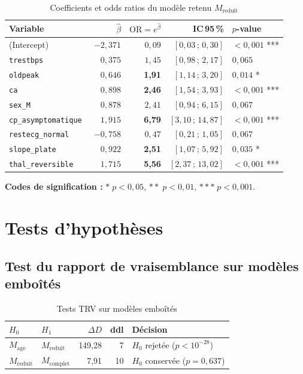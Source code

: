 \documentclass[11pt,a4paper,twoside]{report}
\newcommand{\OR}{\mathrm{OR}}
\theoremstyle{definition}
\begin{document}
\begin{table}[H]
\centering
\caption{Coefficients et odds ratios du modèle retenu $M_{\text{reduit}}$}
\label{tab:or}
\small
\begin{tabular}{lrrrl}
\toprule
Variable & $\hat\beta$ & $\OR = e^{\hat\beta}$ & IC\,95\,\% & $p$-value \\
\midrule
(Intercept)              & $-2{,}371$ & $0{,}09$ & $[0{,}03\,;\,0{,}30]$ & $<0{,}001$ *** \\
\texttt{trestbps}        & $\phantom{-}0{,}375$ & $1{,}45$ & $[0{,}98\,;\,2{,}17]$ & $0{,}065$ \\
\texttt{oldpeak}         & $\phantom{-}0{,}646$ & \textbf{1,91} & $[1{,}14\,;\,3{,}20]$ & $0{,}014$ * \\
\texttt{ca}              & $\phantom{-}0{,}898$ & \textbf{2,46} & $[1{,}54\,;\,3{,}93]$ & $<0{,}001$ *** \\
\texttt{sex\_M}          & $\phantom{-}0{,}878$ & $2{,}41$ & $[0{,}94\,;\,6{,}15]$ & $0{,}067$ \\
\texttt{cp\_asymptomatique} & $\phantom{-}1{,}915$ & \textbf{6,79} & $[3{,}10\,;\,14{,}87]$ & $<0{,}001$ *** \\
\texttt{restecg\_normal} & $-0{,}758$ & $0{,}47$ & $[0{,}21\,;\,1{,}05]$ & $0{,}067$ \\
\texttt{slope\_plate}    & $\phantom{-}0{,}922$ & \textbf{2,51} & $[1{,}07\,;\,5{,}92]$ & $0{,}035$ * \\
\texttt{thal\_reversible} & $\phantom{-}1{,}715$ & \textbf{5,56} & $[2{,}37\,;\,13{,}02]$ & $<0{,}001$ *** \\
\bottomrule
\end{tabular}
\end{table}

\textbf{Codes de signification :} $* \; p < 0{,}05$, $** \; p < 0{,}01$,
$*** \; p < 0{,}001$.

\section{Tests d'hypothèses}

\subsection{Test du rapport de vraisemblance sur modèles emboîtés}

\begin{table}[H]
\centering
\caption{Tests TRV sur modèles emboîtés}
\label{tab:trv}
\begin{tabular}{llrrl}
\toprule
$H_0$ & $H_1$ & $\Delta D$ & ddl & Décision \\
\midrule
$M_{\text{age}}$    & $M_{\text{reduit}}$  & 149,28 & 7  & $H_0$ rejetée ($p < 10^{-28}$) \\
$M_{\text{reduit}}$ & $M_{\text{complet}}$ & 7,91   & 10 & $H_0$ conservée ($p = 0{,}637$) \\
\bottomrule
\end{tabular}
\end{table}
\end{document}
